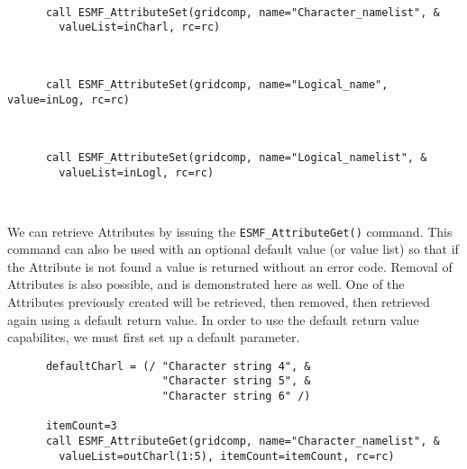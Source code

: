  \begin{verbatim}

      call ESMF_AttributeSet(gridcomp, name="Character_namelist", &
        valueList=inCharl, rc=rc)
 
\end{verbatim}
 

 \begin{verbatim}

      call ESMF_AttributeSet(gridcomp, name="Logical_name", value=inLog, rc=rc)
 
\end{verbatim}
 

 \begin{verbatim}

      call ESMF_AttributeSet(gridcomp, name="Logical_namelist", &
        valueList=inLogl, rc=rc)

 
\end{verbatim}
 

       We can retrieve Attributes by issuing the {\tt ESMF\_AttributeGet()} 
       command.  This command can also be used with an optional default 
       value (or value list) so that if the Attribute is not found a value is 
       returned without an error code.  Removal of Attributes is also 
       possible, and is demonstrated here as well.  One of the Attributes
       previously created will be retrieved, then removed, then 
       retrieved again using a default return value.  In order to use the 
       default return value capabilites, we must first set up a default parameter. 

 \begin{verbatim}
      defaultCharl = (/ "Character string 4", &
                        "Character string 5", &
                        "Character string 6" /)
      
      itemCount=3
      call ESMF_AttributeGet(gridcomp, name="Character_namelist", &
        valueList=outCharl(1:5), itemCount=itemCount, rc=rc) 
 
\end{verbatim}
 

